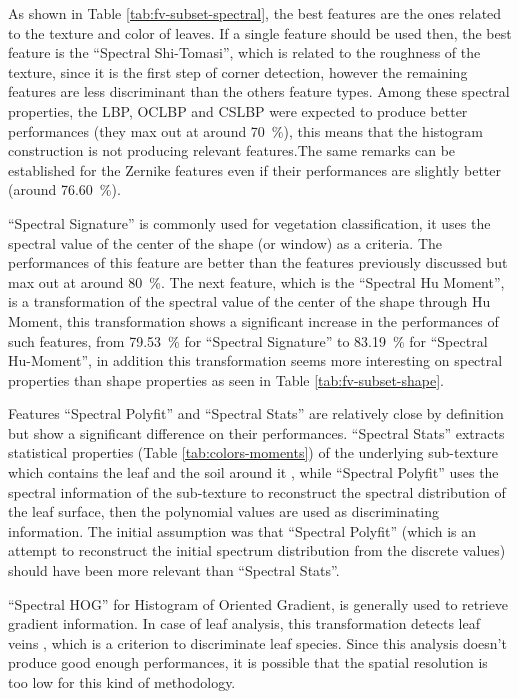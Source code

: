 \documentclass[../thesis.tex]{subfiles}
\begin{document}
    As shown in Table \ref{tab:fv-subset-spectral}, the best features are the ones related to the texture and color of leaves. If a single feature should be used then, the best feature is the ``Spectral Shi-Tomasi'', which is related to the roughness of the texture, since it is the first step of corner detection, however the remaining features are less discriminant than the others feature types. Among these spectral properties, the LBP, OCLBP and CSLBP were expected to produce better performances (they max out at around \SI{70}{\percent}), this means that the histogram construction is not producing relevant features.The same remarks can be established for the Zernike features even if their performances are slightly better (around \SI{76.60}{\percent}).
    
    
    ``Spectral Signature'' is commonly used for vegetation classification, it uses the spectral value of the center of the shape (or window) as a criteria. The performances of this feature are better than the features previously discussed but max out at around \SI{80}{\percent}. The next feature, which is the ``Spectral Hu Moment'', is a transformation of the spectral value of the center of the shape through Hu Moment, this transformation shows a significant increase in the performances of such features, from \SI{79.53}{\percent} for ``Spectral Signature'' to \SI{83.19}{\percent} for ``Spectral Hu-Moment'', in addition this transformation seems more interesting on spectral properties than shape properties as seen in Table \ref{tab:fv-subset-shape}.
    
    Features ``Spectral Polyfit'' and ``Spectral Stats'' are relatively close by definition but show a significant difference on their performances. ``Spectral Stats'' extracts statistical properties (Table \ref{tab:colors-moments}) of the underlying sub-texture which contains the leaf and the soil around it , while ``Spectral Polyfit'' uses the spectral information of the sub-texture to reconstruct the spectral distribution of the leaf surface, then the polynomial values are used as discriminating information. The initial assumption was that ``Spectral Polyfit'' (which is an attempt to reconstruct the initial spectrum distribution from the discrete values) should have been more relevant than ``Spectral Stats''.
    
    ``Spectral HOG'' for Histogram of Oriented Gradient, is generally used to retrieve gradient information. In case of leaf analysis, this transformation detects leaf veins \cite{Larese2014AutomaticCO}, which is a criterion to discriminate leaf species. Since this analysis doesn't produce good enough performances, it is possible that the spatial resolution is too low for this kind of methodology.
    
\end{document}
